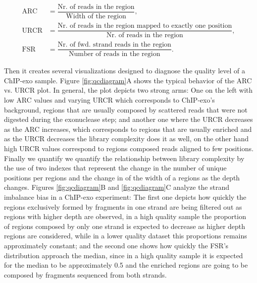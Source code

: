 \documentclass{bmcart}\usepackage[]{graphicx}\usepackage[]{color}
\begin{document}
\begin{align*}
  \text{ARC} &= \dfrac{\text{Nr. of reads in the region}}{\text{Width of the region}}, \\
  \text{URCR} &= \dfrac{\text{Nr. of reads in the region mapped to
      exactly one position}}{\text{Nr. of reads in the region}}, \\
  \text{FSR} &= \dfrac{\text{Nr. of fwd. strand reads in the
      region}}{\text{Number of reads in the region}}.
\end{align*}

Then it creates several visualizations designed to diagnose the
quality level of a ChIP-exo sample. Figure \ref{fig:qcdiagram}A shows
the typical behavior of the ARC vs. URCR plot. In general, the plot
depicts two strong arms: One on the left with low ARC values and
varying URCR which corresponds to ChIP-exo's background, regions that
are usually composed by scattered reads that were not digested during
the exonuclease step; and another one where the URCR decreases as the
ARC increases, which corresponds to regions that are usually enriched
and as the URCR decreases the library complexity does it as well, on
the other hand high URCR values correspond to regions composed reads
aligned to few positions. Finally we quantify we quantify the
relationship between library complexity by the use of two indexes that
represent the change in the number of unique positions per regions and
the change in of the width of a regions as the depth changes. Figures
\ref{fig:qcdiagram}B and \ref{fig:qcdiagram}C analyze the strand
imbalance bias in a ChIP-exo experiment: The first one depicts how
quickly the regions exclusively formed by fragments in one strand are
being filtered out as regions with higher depth are observed, in a
high quality sample the proportion of regions composed by only one
strand is expected to decrease as higher depth regions are considered,
while in a lower quality dataset this proportions remains
approximately constant; and the second one shows how quickly the FSR's
distribution approach the median, since in a high quality sample it is
expected for the median to be approximately 0.5 and the enriched
regions are going to be composed by fragments sequenced from both
strands.

\end{document}
